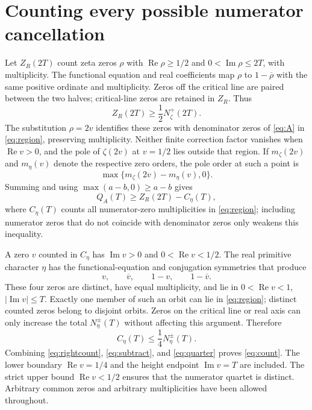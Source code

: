 \documentclass[11pt]{article}
\numberwithin{equation}{section}
\newcommand{\Rea}{\operatorname{Re}}
\newcommand{\Ima}{\operatorname{Im}}
\begin{document}
\section{Counting every possible numerator cancellation}\label{sec:count}

Let $Z_R(2T)$ count zeta zeros $\rho$ with
$\Rea\rho\ge1/2$ and $0<\Ima\rho\le2T$, with multiplicity.
The functional equation and real coefficients map $\rho$ to
$1-\overline\rho$ with the same positive ordinate and multiplicity.
Zeros off the critical line are paired between the two halves;
critical-line zeros are retained in $Z_R$. Thus
\begin{equation}\label{eq:rightcount}
 Z_R(2T)\ge\frac12N_\zeta^+(2T).
\end{equation}
The substitution $\rho=2v$ identifies these zeros with denominator
zeros of \eqref{eq:A} in \eqref{eq:region}, preserving multiplicity.
Neither finite correction factor vanishes when $\Rea v>0$,
and the pole of $\zeta(2v)$ at $v=1/2$ lies outside that region.
If $m_\zeta(2v)$ and $m_\eta(v)$ denote the respective zero orders,
the pole order at such a point is
\begin{equation}\label{eq:multiplicity}
 \max\{m_\zeta(2v)-m_\eta(v),0\}.
\end{equation}
Summing and using $\max(a-b,0)\ge a-b$ gives
\begin{equation}\label{eq:subtract}
 Q_A(T)\ge Z_R(2T)-C_\eta(T),
\end{equation}
where $C_\eta(T)$ counts all numerator-zero multiplicities in
\eqref{eq:region}; including numerator zeros that do not coincide
with denominator zeros only weakens this inequality.

A zero $v$ counted in $C_\eta$ has $\Ima v>0$ and
$0<\Rea v<1/2$. The real primitive character $\eta$ has the
functional-equation and conjugation symmetries that produce
\begin{equation}\label{eq:quartet}
 v,\qquad\overline v,\qquad1-v,\qquad1-\overline v.
\end{equation}
These four zeros are distinct, have equal multiplicity, and lie
in $0<\Rea v<1$, $|\Ima v|\le T$. Exactly one member of such an
orbit can lie in \eqref{eq:region}; distinct counted zeros belong
to disjoint orbits. Zeros on the critical line or real axis can
only increase the total $N_\eta^{\pm}(T)$ without affecting this
argument. Therefore
\begin{equation}\label{eq:quarter}
 C_\eta(T)\le\frac14N_\eta^{\pm}(T).
\end{equation}
Combining \eqref{eq:rightcount}, \eqref{eq:subtract}, and
\eqref{eq:quarter} proves \eqref{eq:count}. The lower boundary
$\Rea v=1/4$ and the height endpoint $\Ima v=T$ are included.
The strict upper bound $\Rea v<1/2$ ensures that the numerator
quartet is distinct. Arbitrary common zeros and arbitrary
multiplicities have been allowed throughout.
\end{document}
